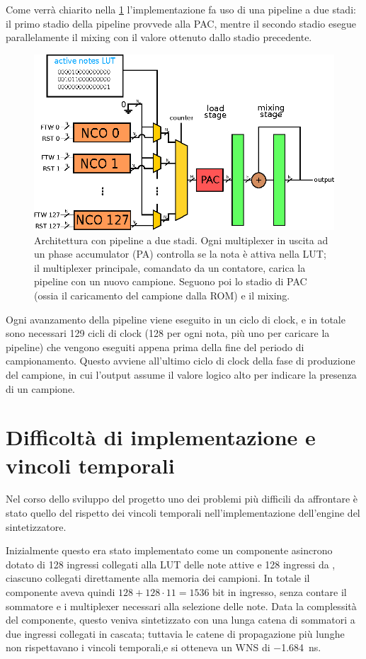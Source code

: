 Come verrà chiarito nella \cref{sec:timing_impl}
l'implementazione fa uso di una pipeline a due stadi:
il primo stadio della pipeline provvede alla PAC, mentre il secondo stadio
esegue parallelamente il mixing con il valore ottenuto dallo stadio
precedente.
\begin{figure}[H]
	\centering
	\def\svgwidth{\columnwidth}
	\includegraphics[width=\columnwidth]{TeX_files/synth_engine.eps}
	\caption{Architettura con pipeline a due stadi. Ogni multiplexer
	 in uscita ad un phase accumulator (PA) controlla se la nota è attiva nella LUT; il
     multiplexer principale, comandato da un contatore, carica la pipeline
     con un nuovo campione. Seguono poi lo stadio di PAC (ossia il caricamento del campione dalla ROM) e il mixing.}
\end{figure}

Ogni avanzamento della pipeline viene eseguito in un ciclo di clock,
e in totale sono necessari 129 cicli di clock
(128 per ogni nota, più uno per caricare la pipeline) che vengono eseguiti
appena prima della fine del periodo di campionamento.
Questo avviene all'ultimo ciclo di clock della fase di produzione del
campione, in cui l'output  assume il valore
logico alto per indicare la presenza di un campione.

\section{Difficoltà di implementazione e vincoli temporali}
\label{sec:timing_impl}
Nel corso dello sviluppo del progetto uno dei problemi più difficili da affrontare
è stato quello del rispetto dei vincoli temporali nell'implementazione dell'engine
del sintetizzatore.

Inizialmente questo era stato implementato come un componente asincrono dotato di 
128 ingressi collegati alla LUT delle note attive e 128 ingressi da ,
ciascuno collegati direttamente alla memoria dei campioni.
In totale il componente aveva quindi $128+128\cdot11 = 1536$ bit in ingresso, senza contare
il sommatore e i multiplexer necessari alla selezione delle note.
Data la complessità del componente, questo veniva sintetizzato con una lunga catena
di sommatori a due ingressi collegati in cascata; tuttavia le catene di propagazione più lunghe
non rispettavano i vincoli temporali,e si otteneva un WNS di \SI{-1.684}{\nano\second}.

